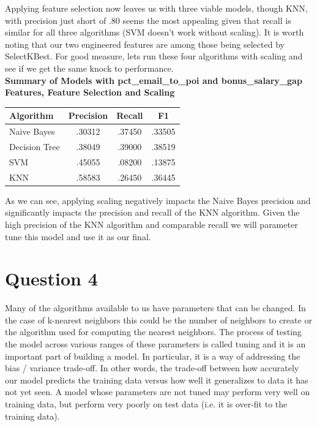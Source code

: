 \documentclass[a4paper,11pt]{report}
\begin{document}
Applying feature selection now leaves us with three viable models, though KNN,
with precision just short of .80 seems the most appealing given that recall is
similar for all three algorithms (SVM doesn't work without scaling).  It is
worth noting that our two engineered features are among those being selected by
SelectKBest.  For good measure, lets run these four algorithms with scaling and
see if we get the same knock to performance. \\

\textbf{Summary of Models with pct\_email\_to\_poi and bonus\_salary\_gap Features,
Feature Selection and Scaling} \\
\begin{center}
    \begin{tabular}{|| l c c c ||}
        \hline Algorithm & Precision & Recall & F1 \\
        \hline\hline
        Naive Bayes & .30312 & .37450 & .33505 \\
        \hline
        Decision Tree & .38049 & .39000 & .38519 \\
        \hline
        SVM & .45055 & .08200 & .13875 \\
        \hline
        KNN & .58583 & .26450 & .36445  \\
        \hline
    \end{tabular}
\end{center}

As we can see, applying scaling negatively impacts the Naive Bayes precision and
significantly impacts the precision and recall of the KNN algorithm.  Given the
high precision of the KNN algorithm and comparable recall we will parameter tune
this model and use it as our final.

\section{Question 4}

Many of the algorithms available to us have parameters that can be changed.
In the case of k-nearest neighbors this could be the number of neighbors to
create or the algorithm used for computing the nearest neighbors.  The process
of testing the model across various ranges of these parameters is called tuning
and it is an important part of building a model. In particular, it is a way of 
addressing the bias / variance trade-off. In other words, the trade-off between
how accurately our model predicts the
training data versus how well it generalizes to data it has not yet seen.  A
model whose parameters are not tuned may perform very well on training data, but
perform very poorly on test data (i.e. it is over-fit to the training data).
\end{document}
